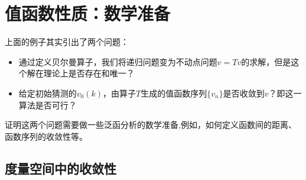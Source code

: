 
\section{值函数性质：数学准备} \label{sec-math-pre}

上面的例子其实引出了两个问题：
\begin{itemize}
    \item 通过定义贝尔曼算子，我们将递归问题变为不动点问题$v=Tv$的求解，但是这个解在理论上是否存在和唯一？
    \item 给定初始猜测的$v_0\left(k\right)$，由算子$T$生成的值函数序列$\{v_n\}$是否收敛到$v$？即这一算法是否可行？
\end{itemize}

证明这两个问题需要做一些泛函分析的数学准备,例如，如何定义函数间的距离、函数序列的收敛性等。


\subsection{度量空间中的收敛性}

